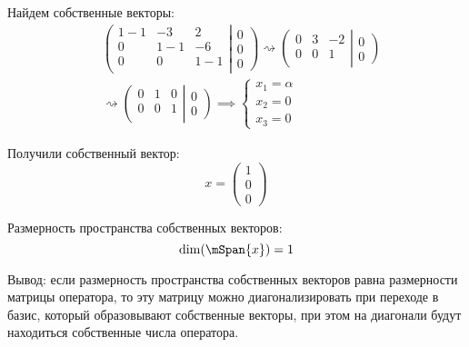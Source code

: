 Найдем собственные векторы:
\begin{align*}
  &
  \left(
    \begin{matrix}
        1 - 1 & -3 & 2 \\
        0 & 1 - 1 & -6 \\
        0 & 0 & 1 - 1 \\
    \end{matrix}
  \right|
  \left. \begin{matrix} 0 \\ 0 \\ 0 \end{matrix} \right)
  \rightsquigarrow
  \left(
    \begin{matrix}
        0 & 3 & -2 \\
        0 & 0 & 1 \\
    \end{matrix}
  \right|
  \left. \begin{matrix}  0 \\ 0 \end{matrix} \right) \\
  & \rightsquigarrow
  \left(
    \begin{matrix}
        0 & 1 & 0 \\
        0 & 0 & 1 \\
    \end{matrix}
  \right|
  \left. \begin{matrix}  0 \\ 0 \end{matrix} \right)
  \implies
  \begin{cases}
    x_1 = α \\
    x_2 = 0 \\
    x_3 = 0
  \end{cases}
\end{align*}

Получили собственный вектор:
\[x = \begin{pmatrix} 1\\0\\0  \end{pmatrix}\]

Размерность пространства собственных векторов:
\[\dim(\mSpan\{x\}) = 1\]

Вывод: если размерность пространства собственных векторов
равна размерности матрицы оператора,
то эту матрицу можно диагонализировать при переходе в базис,
который образовывают собственные векторы,
при этом на диагонали будут находиться собственные числа оператора.

